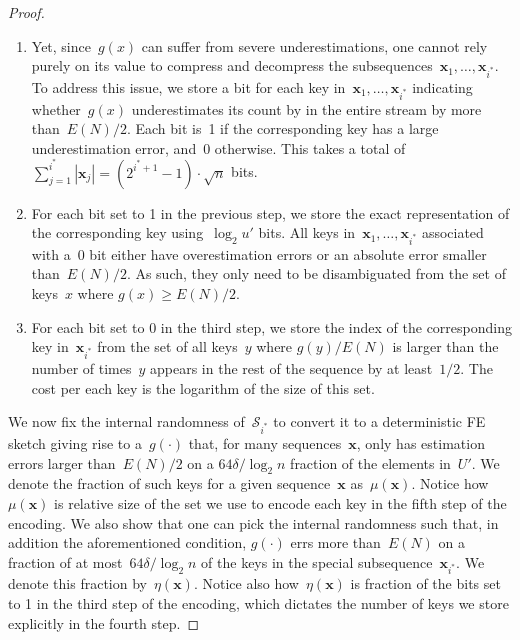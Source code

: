 \documentclass[sigconf]{acmart}
\begin{document}
\begin{proof}
\begin{enumerate}[label=(\roman*)]
            of~$\mathbf{x}_1,\dots,\mathbf{x}_{i^*}$ by more than~$1/2$, $x$
            most probably does not appear
            in~$\mathbf{x}_1,\dots,\mathbf{x}_{i^*}$. This allows for reducing
            the number of bits required to encode each element
            in~$\mathbf{x}_1,\dots,\mathbf{x}_{i^*}$ in our compression scheme.
        \item Yet, since~$g(x)$ can suffer from severe underestimations, one
            cannot rely purely on its value to compress and decompress the
            subsequences~$\mathbf{x}_1,\dots,\mathbf{x}_{i^*}$. To address this
            issue, we store a bit for each key
            in~$\mathbf{x}_1,\dots,\mathbf{x}_{i^*}$ indicating whether~$g(x)$
            underestimates its count by in the entire stream by more
            than~$E(N)/2$. Each bit is~1 if the corresponding key has a large
            underestimation error, and~0 otherwise. This takes a total
            of~$\sum_{j=1}^{i^*} |\mathbf{x}_j|=(2^{i^*+1}-1) \cdot \sqrt{n}$
            bits.
        \item For each bit set to 1 in the previous step, we store the exact
            representation of the corresponding key using~$\log_2 u'$ bits. All
            keys in~$\mathbf{x}_1,\dots,\mathbf{x}_{i^*}$ associated with a~0
            bit either have overestimation errors or an absolute error smaller
            than~$E(N)/2$. As such, they only need to be disambiguated from the
            set of keys~$x$ where $g(x) \geq E(N)/2$.
        \item For each bit set to 0 in the third step, we store the index of
            the corresponding key in~$\mathbf{x}_{i^*}$ from the set of all
            keys~$y$ where $g(y)/E(N)$ is larger than the number of times~$y$
            appears in the rest of the sequence by at least~$1/2$. The cost per
            each key is the logarithm of the size of this set.
    \end{enumerate}

    We now fix the internal randomness of~$\mathcal{S}_{i^*}$ to convert it to
    a deterministic FE sketch giving rise to a~$g(\cdot)$ that, for many
    sequences~$\mathbf{x}$, only has estimation errors larger than~$E(N)/2$ on
    a $64\delta/\log_2 n$ fraction of the elements in~$U'$. We denote the
    fraction of such keys for a given sequence~$\mathbf{x}$
    as~$\mu(\mathbf{x})$. Notice how~$\mu(\mathbf{x})$ is relative size of the
    set we use to encode each key in the fifth step of the encoding. We also
    show that one can pick the internal randomness such that, in addition the
    aforementioned condition, $g(\cdot)$ errs more than~$E(N)$ on a fraction of
    at most~$64\delta/\log_2 n$ of the keys in the special
    subsequence~$\mathbf{x}_{i^*}$. We denote this fraction
    by~$\eta(\mathbf{x})$. Notice also how~$\eta(\mathbf{x})$ is fraction of
    the bits set to 1 in the third step of the encoding, which dictates the
    number of keys we store explicitly in the fourth step. 


\end{proof}
\end{document}
